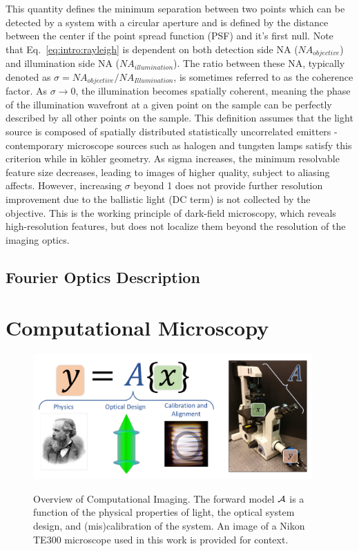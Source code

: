 This quantity defines the minimum separation between two points which can be detected by a system with a circular aperture and is defined by the distance between the center if the point spread function (PSF) and it's first null. Note that Eq.~\ref{eq:intro:rayleigh} is dependent on both detection side NA ($NA_{objective}$) and illumination side NA ($NA_{illumination}$). The ratio between these NA, typically denoted as $\sigma = NA_{objective}/NA_{Illumination}$, is sometimes referred to as the coherence factor. As $\sigma \longrightarrow 0 $, the illumination becomes spatially coherent, meaning the phase of the illumination wavefront at a given point on the sample can be perfectly described by all other points on the sample. This definition assumes that the light source is composed of spatially distributed statistically uncorrelated emitters - contemporary microscope sources such as halogen and tungsten lamps satisfy this criterion while in k{\"o}hler geometry. As sigma increases, the minimum resolvable feature size decreases, leading to images of higher quality, subject to aliasing affects. However, increasing $\sigma$ beyond 1 does not provide further resolution improvement due to the ballistic light (DC term) is not collected by the objective. This is the working principle of dark-field microscopy, which reveals high-resolution features, but does not localize them beyond the resolution of the imaging optics.

\subsection{Fourier Optics Description}


\section{Computational Microscopy}

\begin{figure}
    \centering
    \includegraphics[width=0.95\textwidth]{figures/fig_intro_comp_imaging.pdf}
    \label{fig:intro_overview}
    \caption{Overview of Computational Imaging. The forward model $\mathcal{A}$ is a function of the physical properties of light, the optical system design, and (mis)calibration of the system. An image of a Nikon TE300 microscope used in this work is provided for context.}
\end{figure}

